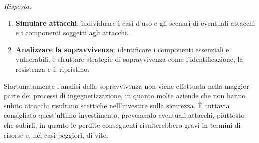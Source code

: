 \documentclass{article}
\newenvironment{solution}
    {\textit{Risposta:}}
    {}
\begin{document}
\begin{solution}
\begin{enumerate}
	\item \textbf{Simulare attacchi}: individuare i casi d'uso e gli scenari di eventuali attacchi e i componenti soggetti agli attacchi.
	\item \textbf{Analizzare la sopravvivenza}: identificare i componenti essenziali e vulnerabili, e sfruttare strategie di sopravvivenza come l'identificazione, la resistenza e il ripristino.
\end{enumerate}
Sfortunatamente l'analisi della sopravvivenza non viene effettuata nella maggior parte dei processi di ingegnerizzazione, in quanto molte aziende che non hanno subito attacchi risultano scettiche nell'investire sulla sicurezza.
È tuttavia consigliato quest'ultimo investimento, prevenendo eventuali attacchi, piuttosto che subirli, in quanto le perdite conseguenti risulterebbero gravi in termini di risorse e, nei casi peggiori, di vite.
\end{solution}
\end{document}

